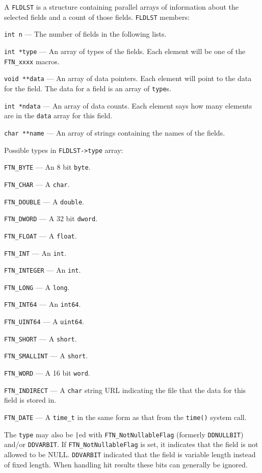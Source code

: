 A \verb`FLDLST` is a structure containing parallel arrays of information
about the selected fields and a count of those fields. \verb`FLDLST` members:

\verb`int n` --- The number of fields in the following lists.

\verb`int *type` --- An array of types of the fields.  Each element will
be one of the \verb`FTN_xxxx` macros.

\verb`void **data` --- An array of data pointers.  Each element will
point to the data for the field. The data for a field is an
array of \verb`type`s.

\verb`int *ndata` ---  An array of data counts. Each element says how
many elements are in the \verb`data` array for this field.

\verb`char **name` --- An array of strings containing the names of the
fields.

Possible types in \verb`FLDLST->type` array:

\verb`FTN_BYTE` --- An 8 bit \verb`byte`.

\verb`FTN_CHAR` --- A \verb`char`.

\verb`FTN_DOUBLE` --- A \verb`double`.

\verb`FTN_DWORD` --- A 32 bit \verb`dword`.

\verb`FTN_FLOAT` --- A \verb`float`.

\verb`FTN_INT` --- An \verb`int`.

\verb`FTN_INTEGER` --- An \verb`int`.

\verb`FTN_LONG` --- A \verb`long`.

\verb`FTN_INT64` --- An \verb`int64`.

\verb`FTN_UINT64` --- A \verb`uint64`.

\verb`FTN_SHORT` --- A \verb`short`.

\verb`FTN_SMALLINT` --- A \verb`short`.

\verb`FTN_WORD` --- A 16 bit \verb`word`.

\verb`FTN_INDIRECT` --- A \verb`char` string URL indicating the file that
the data for this field is stored in.

\verb`FTN_DATE` --- A \verb`time_t` in the same form as that from the
\verb`time()` system call.

The \verb`type` may also be \verb`|`ed with \verb`FTN_NotNullableFlag` (formerly \verb`DDNULLBIT`) and/or
\verb`DDVARBIT`. If \verb`FTN_NotNullableFlag` is set, it indicates that the field is not
allowed to be NULL. \verb`DDVARBIT` indicated that the field is
variable length instead of fixed length. When handling hit results
these bits can generally be ignored.

